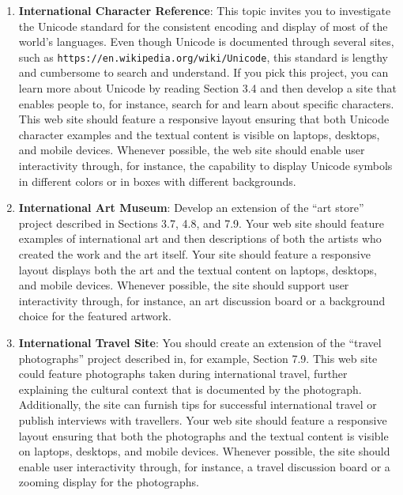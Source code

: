 \documentclass[11pt]{article}
\newcommand{\url}[1]{\lstinline{#1}}
\begin{document}
\begin{enumerate}

  \setlength{\itemsep}{0in}

  \item {\bf International Character Reference}: This topic invites you to
    investigate the Unicode standard for the consistent encoding and display of
    most of the world's languages. Even though Unicode is documented through
    several sites, such as \url{https://en.wikipedia.org/wiki/Unicode}, this
    standard is lengthy and cumbersome to search and understand. If you pick
    this project, you can learn more about Unicode by reading Section 3.4 and
    then develop a site that enables people to, for instance, search for and
    learn about specific characters. This web site should feature a responsive
    layout ensuring that both Unicode character examples and the textual content
    is visible on laptops, desktops, and mobile devices. Whenever possible, the
    web site should enable user interactivity through, for instance, the
    capability to display Unicode symbols in different colors or in boxes with
    different backgrounds.

  \item {\bf International Art Museum}: Develop an extension of the ``art
    store'' project described in Sections 3.7, 4.8, and 7.9. Your web site
    should feature examples of international art and then descriptions of both
    the artists who created the work and the art itself. Your site should
    feature a responsive layout displays both the art and the textual content on
    laptops, desktops, and mobile devices. Whenever possible, the site should
    support user interactivity through, for instance, an art discussion board or
    a background choice for the featured artwork.

  \item {\bf International Travel Site}: You should create an extension of the
    ``travel photographs'' project described in, for example, Section 7.9. This
    web site could feature photographs taken during international travel,
    further explaining the cultural context that is documented by the
    photograph. Additionally, the site can furnish tips for successful
    international travel or publish interviews with travellers. Your web site
    should feature a responsive layout ensuring that both the photographs and
    the textual content is visible on laptops, desktops, and mobile devices.
    Whenever possible, the site should enable user interactivity through, for
    instance, a travel discussion board or a zooming display for the
    photographs.


\end{enumerate}
\end{document}
